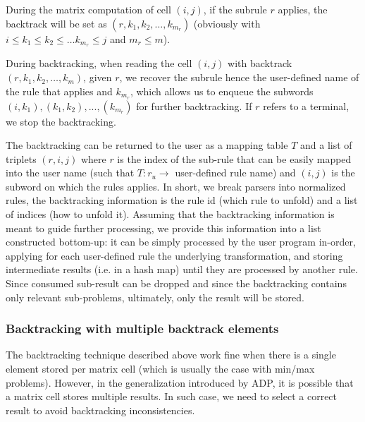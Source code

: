 	\item During the matrix computation of cell $(i,j)$, if the subrule $r$ applies, the backtrack will be set as $(r,k_1,k_2,\ldots,k_{m_r})$ (obviously with $i\le k_1\le k_2\le \ldots k_{m_r}\le j$ and $m_r\le m$).
	\item During backtracking, when reading the cell $(i,j)$ with backtrack $(r,k_1,k_2,\ldots,k_m)$, given $r$, we recover the subrule hence the user-defined name of the rule that applies and $k_{m_r}$, which allows us to enqueue the subwords $(i,k_1), (k_1,k_2), ..., (k_{m_r})$ for further backtracking. If $r$ refers to a terminal, we stop the backtracking.
	\item The backtracking can be returned to the user as a mapping table $T$ and a list of triplets $(r,i,j)$ where $r$ is the index of the sub-rule that can be easily mapped into the user name (such that $T: r_u \to$ user-defined rule name) and $(i,j)$ is the subword on which the rules applies.
\ole
In short, we break parsers into normalized rules, the backtracking information is the rule id (which rule to unfold) and a list of indices (how to unfold it).
\ule
Assuming that the backtracking information is meant to guide further processing, we provide this information into a list constructed bottom-up: it can be simply processed by the user program in-order, applying for each user-defined rule the underlying transformation, and storing intermediate results (i.e. in a hash map) until they are processed by another rule. Since consumed sub-result can be dropped and since the backtracking contains only relevant sub-problems, ultimately, only the result will be stored.

\subsubsection{Backtracking with multiple backtrack elements}
The backtracking technique described above work fine when there is a single element stored per matrix cell (which is usually the case with min/max problems). However, in the generalization introduced by ADP, it is possible that a matrix cell stores multiple results. In such case, we need to select a correct result to avoid backtracking inconsistencies.

